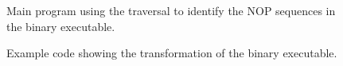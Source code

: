 \begin{figure}[!h]
{\indent
{\mySmallFontSize

\begin{latexonly}
   
\end{latexonly}

\begin{htmlonly}
   
\end{htmlonly}

}
}
\caption{Main program using the traversal to identify the NOP sequences in the binary executable.}
\label{Tutorial:exampleTransformBinaryToDetectNOPs_main}
\end{figure}




\begin{figure}[!h]
{\indent
{\mySmallFontSize

\begin{latexonly}
   
\end{latexonly}

\begin{htmlonly}
   
\end{htmlonly}

}
}
\caption{Example code showing the transformation of the binary executable.}
\label{Tutorial:exampleTransformBinaryToInsertNOPs}
\end{figure}

